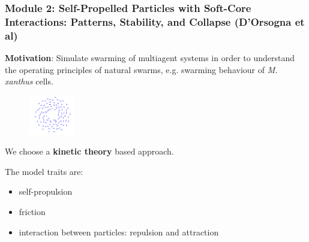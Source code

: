 \documentclass[compress]{beamer}
\begin{document}


\begin{frame}
  \frametitle{Module 2: Self-Propelled Particles with Soft-Core Interactions: Patterns, Stability, and Collapse (D'Orsogna et al)}
  
  \textbf{Motivation}: Simulate swarming of multiagent systems in order to understand the operating principles of natural swarms, e.g. swarming behaviour of \textit{M. xanthus} cells. \\ 
  
  
  \begin{figure}
  	\begin{center}
  		\includegraphics[width=0.18\textwidth]{./img/mill.png}
  	\end{center}
  \end{figure}


  We choose a \textbf{kinetic theory} based approach.\\

\hspace{3}

  The model traits are:
  \begin{itemize}
  	\item self-propulsion
  	\item friction 
  	\item interaction between particles: repulsion and attraction
  \end{itemize}
 
%


\end{frame}
\end{document}

